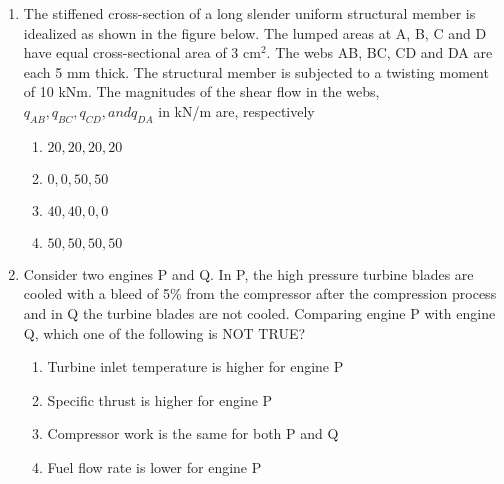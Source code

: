 \documentclass[journal,12pt,onecolumn]{IEEEtran}
\theoremstyle{remark}
\begin{document}
\begin{enumerate}
\begin{figure}[!ht]
    \label{fig:my_label}
    \end{figure}

    \item The stiffened cross-section of a long slender uniform structural member is idealized as shown in the figure below. The lumped areas at A, B, C and D have equal cross-sectional area of 3 cm$^2$. The webs AB, BC, CD and DA are each 5 mm thick. The structural member is subjected to a twisting moment of 10 kNm. The magnitudes of the shear flow in the webs, $q_{AB}, q_{BC}, q_{CD}, and q_{DA}$ in kN/m are, respectively
    \begin{figure}[!ht]
\centering
{}%

\label{fig:my_label}
\end{figure}

    \begin{enumerate}
        \item $20, 20, 20, 20$
        \item $0, 0, 50, 50$
        \item $40, 40, 0, 0$
        \item $50, 50, 50, 50$
    \end{enumerate}

    \item Consider two engines P and Q. In P, the high pressure turbine blades are cooled with a bleed of 5\% from the compressor after the compression process and in Q the turbine blades are not cooled. Comparing engine P with engine Q, which one of the following is NOT TRUE? 
    \begin{enumerate}
        \item Turbine inlet temperature is higher for engine P 
        \item Specific thrust is higher for engine P 
        \item Compressor work is the same for both P and Q
        \item Fuel flow rate is lower for engine P 
    \end{enumerate}


\end{enumerate}
\end{document}
